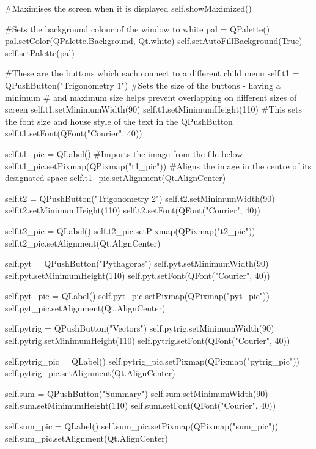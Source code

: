 \begin{landscape}
\begin{python}
        #Maximises the screen when it is displayed
        self.showMaximized()

        #Sets the background colour of the window to white
        pal = QPalette()
        pal.setColor(QPalette.Background, Qt.white)
        self.setAutoFillBackground(True)
        self.setPalette(pal)

        #These are the buttons which each connect to  a different child menu
        self.t1 = QPushButton("Trigonometry 1")
        #Sets the size of the buttons - having a minimum
        # and maximum size helps prevent overlapping on different sizes of screen
        self.t1.setMinimumWidth(90)
        self.t1.setMinimumHeight(110)
        #This sets the font size and house style of the text in the QPushButton
        self.t1.setFont(QFont("Courier", 40))
        
        self.t1_pic = QLabel()
        #Imports the image from the file below
        self.t1_pic.setPixmap(QPixmap("t1_pic"))
        #Aligns the image in the centre of its designated space
        self.t1_pic.setAlignment(Qt.AlignCenter)
        
        self.t2 = QPushButton("Trigonometry 2")
        self.t2.setMinimumWidth(90)
        self.t2.setMinimumHeight(110)
        self.t2.setFont(QFont("Courier", 40))
        
        self.t2_pic = QLabel()
        self.t2_pic.setPixmap(QPixmap("t2_pic"))
        self.t2_pic.setAlignment(Qt.AlignCenter)
        
        self.pyt = QPushButton("Pythagoras")
        self.pyt.setMinimumWidth(90)
        self.pyt.setMinimumHeight(110)
        self.pyt.setFont(QFont("Courier", 40))
        
        self.pyt_pic = QLabel()
        self.pyt_pic.setPixmap(QPixmap("pyt_pic"))
        self.pyt_pic.setAlignment(Qt.AlignCenter)
        
        self.pytrig = QPushButton("Vectors")
        self.pytrig.setMinimumWidth(90)
        self.pytrig.setMinimumHeight(110)
        self.pytrig.setFont(QFont("Courier", 40))
        
        self.pytrig_pic = QLabel()
        self.pytrig_pic.setPixmap(QPixmap("pytrig_pic"))
        self.pytrig_pic.setAlignment(Qt.AlignCenter)
        
        self.sum = QPushButton("Summary")
        self.sum.setMinimumWidth(90)
        self.sum.setMinimumHeight(110)
        self.sum.setFont(QFont("Courier", 40))
        
        self.sum_pic = QLabel()
        self.sum_pic.setPixmap(QPixmap("sum_pic"))
        self.sum_pic.setAlignment(Qt.AlignCenter)


\end{python}
\end{landscape}
